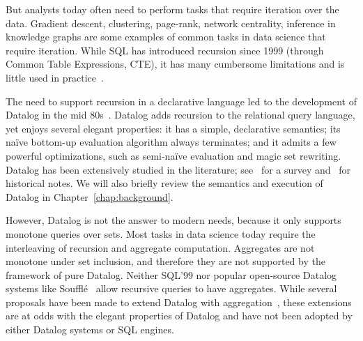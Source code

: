 But analysts today often need to perform tasks that require
iteration over the data.
Gradient descent, clustering, page-rank, network centrality, inference
in knowledge graphs are some examples of common tasks in data science
that require iteration.  While SQL has introduced recursion since 1999
(through Common Table Expressions, CTE), it has many cumbersome
limitations and is little used in practice~\cite{frankmcsherry-2022}.

The need to support recursion in a declarative language led to the
development of Datalog in the mid 80s~\cite{DBLP:conf/pods/Vianu21}.
Datalog adds recursion to the relational query language, yet enjoys several elegant
properties: it has a simple, declarative semantics; its na\"ive
bottom-up evaluation algorithm always terminates; and it admits a few
powerful optimizations, such as semi-na\"ive evaluation and magic set
rewriting.  Datalog has been extensively studied in the literature;
see~\cite{DBLP:journals/ftdb/GreenHLZ13} for a survey
and~\cite{DBLP:books/mc/18/MaierTKW18,DBLP:conf/pods/Vianu21} for historical notes.
We will also briefly review the semantics and execution of Datalog in
 Chapter~\ref{chap:background}.

However, Datalog is not the answer to modern needs, because it only
supports monotone queries over sets.  Most tasks in data science today
require the interleaving of recursion and aggregate computation.
Aggregates are not monotone under set inclusion, and therefore they
are not supported by the framework of pure Datalog.  Neither SQL'99
nor popular open-source Datalog systems like
Souffl\'e~\cite{DBLP:conf/cav/JordanSS16} allow recursive queries to
have aggregates.  While several proposals have been made to extend
Datalog with
aggregation~\cite{DBLP:conf/pods/GangulyGZ91,DBLP:conf/pods/RossS92,DBLP:journals/jcss/GangulyGZ95,DBLP:journals/vldb/MazuranSZ13,DBLP:conf/icde/ShkapskyYZ15,DBLP:conf/sigmod/ShkapskyYICCZ16,DBLP:conf/amw/ZanioloYDI16,DBLP:journals/tplp/ZanioloYDSCI17,DBLP:conf/amw/ZanioloYIDSC18,DBLP:journals/tplp/CondieDISYZ18,DBLP:conf/sigmod/0001WMSYDZ19,DBLP:journals/corr/abs-1910-08888,DBLP:journals/corr/abs-1909-08249,DBLP:journals/debu/ZanioloD0LL021},
these extensions are at odds with the elegant properties of Datalog
and have not been adopted by either Datalog systems or SQL engines.

